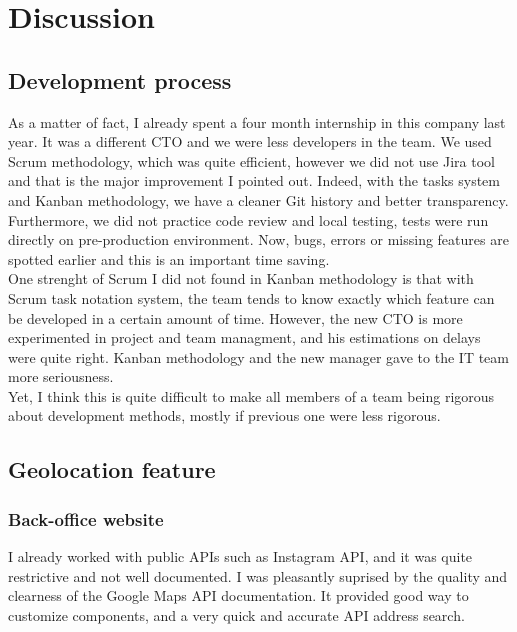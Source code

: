 \documentclass{article}
\begin{document}
                    
        \newpage
        \section{Discussion}
            \subsection{Development process}
                As a matter of fact, I already spent a four month internship in this company last year. It was a different CTO and we were less developers in the team.
            We used Scrum methodology, which was quite efficient, however we did not use Jira tool and that is the major improvement I pointed out.
            Indeed, with the tasks system and Kanban methodology, we have a cleaner Git history and better transparency. Furthermore, we did not practice
            code review and local testing, tests were run directly on pre-production environment. Now, bugs, errors or missing features are spotted earlier
            and this is an important time saving.\\

            One strenght of Scrum I did not found in Kanban methodology is that with Scrum task notation system, the team tends to know exactly which feature can be developed in
            a certain amount of time. However, the new CTO is more experimented in project and team managment, and his estimations on delays were quite right.
            Kanban methodology and the new manager gave to the IT team more seriousness.\\

            Yet, I think this is quite difficult to make all members of a team being rigorous about development methods, mostly if previous one were less rigorous.
            
            \subsection{Geolocation feature}
                \subsubsection{Back-office website}
                    I already worked with public APIs such as Instagram API, and it was quite restrictive and not well documented. I was pleasantly suprised
                    by the quality and clearness of the Google Maps API documentation. It provided good way to customize components, and a very quick and accurate
                    API address search.
\end{document}
